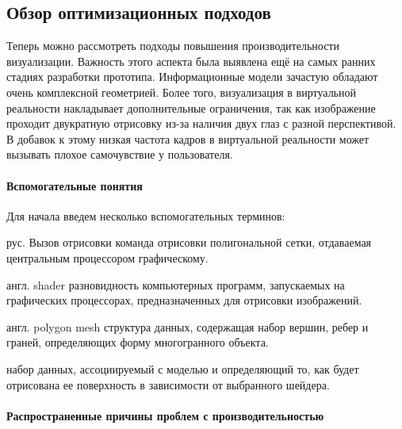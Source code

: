 ﻿\subsection{Обзор оптимизационных подходов}
\label{subsections:Optimization}

Теперь можно рассмотреть подходы повышения производительности визуализации.
Важность этого аспекта была выявлена 
ещё на самых ранних стадиях разработки прототипа.
Информационные модели зачастую обладают очень комплексной геометрией.
Более того, визуализация в виртуальной реальности накладывает
дополнительные ограничения, так как изображение проходит двукратную отрисовку
из-за наличия двух глаз с разной перспективой.
В добавок к этому низкая частота кадров в виртуальной реальности
может вызывать плохое самочувствие у пользователя.%
\cite{Weech2019}

\paragraph{Вспомогательные понятия}

\begin{rglossary}
    Для начала введем несколько вспомогательных терминов:

    {рус. Вызов отрисовки}
    {команда отрисовки полигональной сетки,
    отдаваемая центральным процессором графическому.}

    {англ. shader}
    {разновидность компьютерных программ, запускаемых на графических процессорах,
    предназначенных для отрисовки изображений.}

    {англ. polygon mesh}
    {структура данных, содержащая набор вершин, ребер и граней,
    определяющих форму многогранного объекта.}

    {набор данных, ассоциируемый с моделью и
    определяющий то, как будет отрисована ее поверхность
    в зависимости от выбранного шейдера.}
\end{rglossary}

\paragraph{Распространенные причины проблем с производительностью}

